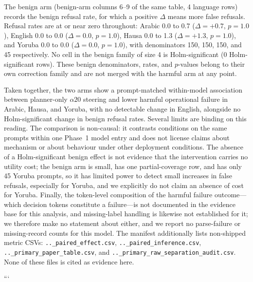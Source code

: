 The benign arm (benign-arm columns 6--9 of the same table, 4 language rows)
records the benign refusal rate, for which a positive $\Delta$ means more false
refusals. Refusal rates are at or near zero throughout: Arabic 0.0 to 0.7
($\Delta = +0.7$, $p = 1.0$), English 0.0 to 0.0 ($\Delta = 0.0$, $p = 1.0$),
Hausa 0.0 to 1.3 ($\Delta = +1.3$, $p = 1.0$), and Yoruba 0.0 to 0.0
($\Delta = 0.0$, $p = 1.0$), with denominators 150, 150, 150, and 45
respectively. No cell in the benign family of size 4 is Holm-significant
(0 Holm-significant rows). These benign denominators, rates, and $p$-values
belong to their own correction family and are not merged with the harmful arm at
any point.

Taken together, the two arms show a prompt-matched within-model association
between planner-only $\alpha20$ steering and lower harmful operational failure
in Arabic, Hausa, and Yoruba, with no detectable change in English, alongside no
Holm-significant change in benign refusal rates. Several limits are binding on
this reading. The comparison is non-causal: it contrasts conditions on the same
prompts within one Phase~1 model entry and does not license claims about
mechanism or about behaviour under other deployment conditions. The absence of a
Holm-significant benign effect is not evidence that the intervention carries no
utility cost; the benign arm is small, has one partial-coverage row, and has only
45 Yoruba prompts, so it has limited power to detect small increases in false
refusals, especially for Yoruba, and we explicitly do not claim an absence of
cost for Yoruba. Finally, the token-level composition of the harmful failure
outcome---which decision tokens constitute a failure---is not documented in the
evidence base for this analysis, and missing-label handling is likewise not
established for it; we therefore make no statement about either, and we report no
parse-failure or missing-record counts for this model. The manifest additionally
lists non-shipped metric CSVs: \texttt{..\_paired\_effect.csv},
\texttt{..\_paired\_inference.csv}, \texttt{..\_primary\_paper\_table.csv}, and
\texttt{..\_primary\_raw\_separation\_audit.csv}. None of these files is cited as
evidence here.

```
